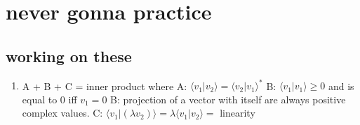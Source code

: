 \documentclass{article}
\begin{document}
\section{never gonna practice}

\subsection*{working on these}
\begin{enumerate}
    
    \item A + B + C = inner product where 
        \subitem A: $ \langle v_1 | v_2 \rangle = \langle v_2 | v_1 \rangle^*$ 
        \subitem B: $ \langle v_1 | v_1 \rangle \ge 0 $ and is equal to 0 iff $ v_1 = 0 $
        \subitem B: projection of a vector with itself are always positive complex values.
        \subitem C: $ \langle v_1 | (\lambda v_2)\rangle = \lambda \langle v_1 | v_2 \rangle = $ linearity 

\end{enumerate}

    
\end{document}
